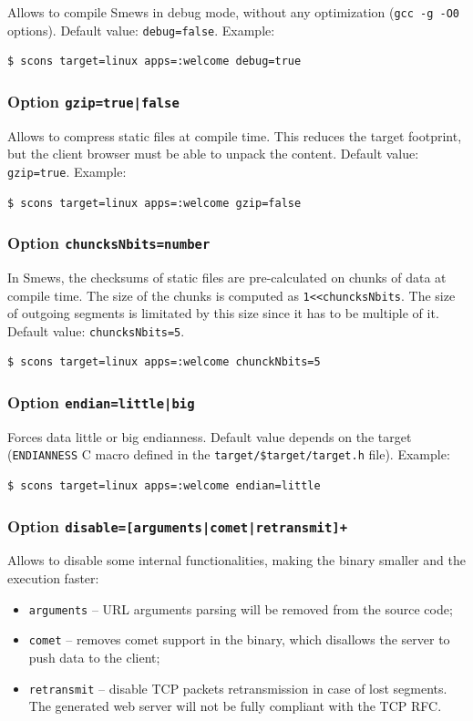 \documentclass{report}
\begin{document}
Allows to compile Smews in debug mode, without any optimization (\verb+gcc -g -O0+ options). Default value: \verb+debug=false+. Example:
\begin{verbatim}
$ scons target=linux apps=:welcome debug=true
\end{verbatim}

\subsubsection{Option {\tt gzip=true|false}}

Allows to compress static files at compile time. This reduces the target footprint, but the client browser must be able to unpack the content. Default value: \verb+gzip=true+. Example:
\begin{verbatim}
$ scons target=linux apps=:welcome gzip=false
\end{verbatim}

\subsubsection{Option {\tt chuncksNbits=number}}

In Smews, the checksums of static files are pre-calculated on chunks of data at compile time. The size of the chunks is computed as \verb+1<<chuncksNbits+. The size of outgoing segments is limitated by this size since it has to be multiple of it. Default value: \verb+chuncksNbits=5+.
\begin{verbatim}
$ scons target=linux apps=:welcome chunckNbits=5
\end{verbatim}

\subsubsection{Option {\tt endian=little|big}}

Forces data little or big endianness. Default value depends on the target (\verb+ENDIANNESS+ C macro defined in the \verb+target/$target/target.h+ file). Example:
\begin{verbatim}
$ scons target=linux apps=:welcome endian=little
\end{verbatim}

\subsubsection{Option {\tt disable=[arguments|comet|retransmit]+}}

Allows to disable some internal functionalities, making the binary smaller and the execution faster:
\begin{itemize}
\item \texttt{arguments} -- URL arguments parsing will be removed from the source code;
\item \texttt{comet} -- removes comet support in the binary, which disallows the server to push data to the client;
\item \texttt{retransmit} -- disable TCP packets retransmission in case of lost segments. The generated web server will not be fully compliant with the TCP RFC.
\end{itemize}
\end{document}
